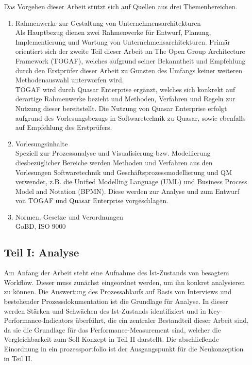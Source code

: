 Das Vorgehen dieser Arbeit stützt sich auf Quellen aus drei Themenbereichen.

\begin{enumerate}



\item{Rahmenwerke zur Gestaltung von Unternehmensarchitekturen}
\\ Als Hauptbezug dienen zwei Rahmenwerke für Entwurf, Planung, Implementierung und Wartung von Unternehmensarchitekturen. 
Primär orientiert sich der zweite Teil dieser Arbeit an The Open Group Architecture Framework (TOGAF), welches aufgrund seiner Bekanntheit und Empfehlung durch den Erstprüfer dieser Arbeit zu Gunsten des Umfangs keiner weiteren Methodenauswahl unterworfen wird. \\
TOGAF wird durch Quasar Enterprise ergänzt, welches sich konkrekt auf derartige Rahmenwerke bezieht und Methoden, Verfahren und Regeln zur Nutzung dieser bereitstellt. 
Die Nutzung von Quasar Enterprise erfolgt aufgrund des Vorlesungsbezugs in Softwaretechnik zu Quasar, sowie ebenfalls auf Empfehlung des Erstprüfers.

\item{Vorlesungsinhalte}
\\ Speziell zur Prozessanalyse und Visualisierung bzw. Modellierung diesbezüglicher Bereiche werden Methoden und Verfahren aus den Vorlesungen Softwaretechnik und Geschäftsprozessmodellierung und QM verwendet, z.B. die Unified Modelling Language (UML) und Business Process Model and Notation (BPMN). 
Diese werden zur Analyse und zum Entwurf von TOGAF und Quasar Enterprise vorgeschlagen.

\item{Normen, Gesetze und Verordnungen}
\\ GoBD, ISO 9000
\end{enumerate}

\subsection{Teil I: Analyse}

Am Anfang der Arbeit steht eine Aufnahme des Ist-Zustands von besagtem Workflow. Dieser muss zunächst eingeordnet werden, um ihn konkret analysieren zu können. 
Die Auswertung des Prozessablaufs auf Basis von Interviews und bestehender Prozessdokumentation ist die Grundlage für Analyse. 
In dieser werden Stärken und Schwächen des Ist-Zustands identifiziert und in Key-Performance-Indicators überführt, die ein zentraler Bestandteil dieser Arbeit sind, da sie die Grundlage für das Performance-Measurement sind, welcher die Vergleichbarkeit zum Soll-Konzept in Teil II darstellt. 
Die abschließende Einordnung in ein prozessportfolio ist der Ausgangspunkt für die Neukonzeption in Teil II.

